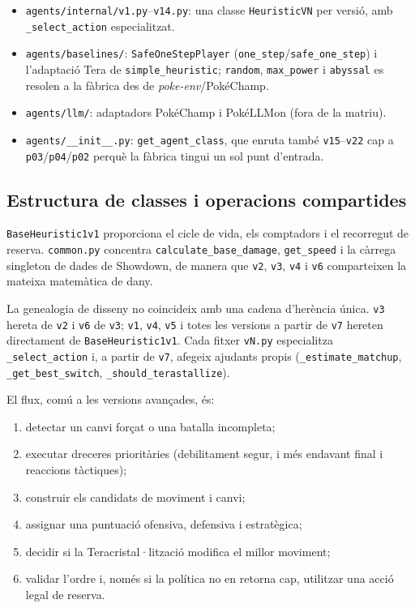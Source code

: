 \begin{itemize}
    \item \texttt{agents/internal/v1.py}--\texttt{v14.py}: una classe \texttt{HeuristicVN} per versió, amb \texttt{\_select\_action} especialitzat.
    \item \texttt{agents/baselines/}: \texttt{SafeOneStepPlayer} (\texttt{one\_step}/\texttt{safe\_one\_step}) i l'adaptació Tera de \texttt{simple\_heuristic}; \texttt{random}, \texttt{max\_power} i \texttt{abyssal} es resolen a la fàbrica des de \textit{poke-env}/PokéChamp.
    \item \texttt{agents/llm/}: adaptadors PokéChamp i PokéLLMon (fora de la matriu).
    \item \texttt{agents/\_\_init\_\_.py}: \texttt{get\_agent\_class}, que enruta també \texttt{v15}--\texttt{v22} cap a \texttt{p03}/\texttt{p04}/\texttt{p02} perquè la fàbrica tingui un sol punt d'entrada.
\end{itemize}

\subsection{Estructura de classes i operacions compartides}

\texttt{BaseHeuristic1v1} proporciona el cicle de vida, els comptadors i el recorregut de reserva. \texttt{common.py} concentra \texttt{calculate\_base\_damage}, \texttt{get\_speed} i la càrrega singleton de dades de Showdown, de manera que \texttt{v2}, \texttt{v3}, \texttt{v4} i \texttt{v6} comparteixen la mateixa matemàtica de dany.

La genealogia de disseny no coincideix amb una cadena d'herència única. \texttt{v3} hereta de \texttt{v2} i \texttt{v6} de \texttt{v3}; \texttt{v1}, \texttt{v4}, \texttt{v5} i totes les versions a partir de \texttt{v7} hereten directament de \texttt{BaseHeuristic1v1}. Cada fitxer \texttt{vN.py} especialitza \texttt{\_select\_action} i, a partir de \texttt{v7}, afegeix ajudants propis (\texttt{\_estimate\_matchup}, \texttt{\_get\_best\_switch}, \texttt{\_should\_terastallize}).

El flux, comú a les versions avançades, és:

\begin{enumerate}
    \item detectar un canvi forçat o una batalla incompleta;
    \item executar dreceres prioritàries (debilitament segur, i més endavant final i reaccions tàctiques);
    \item construir els candidats de moviment i canvi;
    \item assignar una puntuació ofensiva, defensiva i estratègica;
    \item decidir si la Teracristal·lització modifica el millor moviment;
    \item validar l'ordre i, només si la política no en retorna cap, utilitzar una acció legal de reserva.
\end{enumerate}

